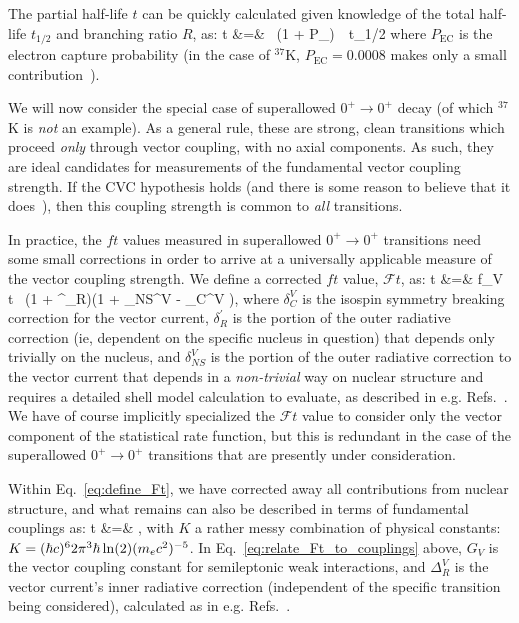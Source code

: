 The partial half-life $t$ can be quickly calculated given knowledge of the total half-life $t_{1/2}$ and branching ratio $R$, as:
\bea
t &=&   \, (1 + P_{}) \,\, t_{1/2}
\eea
where $P_{\mathrm{EC}}$ is the electron capture probability (in the case of $^{37}$K, $P_{\mathrm{EC}}=0.0008$ makes only a small contribution~\cite{SeverijnsTandecki2008}).

We will now consider the special case of superallowed $0^+ \rightarrow 0^+$ decay (of which $^{37}$K is \emph{not} an example).  As a general rule, these are strong, clean transitions which proceed \emph{only} through vector coupling, with no axial components.  As such, they are 
ideal candidates for measurements of the fundamental vector coupling strength.
If the \ac{CVC} hypothesis holds (and there is some reason to believe that it does~\cite{severijns2006}\cite{HardyTownerSuperallowed2020}), then this coupling strength is common to \emph{all} transitions.



In practice, the $ft$ values measured in superallowed $0^+ \rightarrow 0^+$ transitions need some small corrections in order to arrive at a universally applicable measure of the vector coupling strength.  We define a corrected $ft$ value, $\mathcal{F}t$, as:
\bea
{}t &=& f_V t \, (1 + \delta^\prime_R)(1 + \delta_{NS}^V - \delta_C^{V} ),
\label{eq:define_Ft}
\eea
where 
$\delta_C^{V}$ is the isospin symmetry breaking correction for the vector current, 
$\delta^\prime_R$ is the portion of the outer radiative correction (ie, dependent on the specific nucleus in question) that depends only trivially on the nucleus, 
and
$\delta_{NS}^{V}$ is the portion of the outer radiative correction %
to the vector current that depends in a \emph{non-trivial} way on nuclear structure and requires a detailed shell model calculation to evaluate, as described in e.g.  Refs.~\cite{TownerHardy2008}\cite{JausRasche1990}\cite{barker1992}\cite{Towner1992}\cite{Towner1994}.  We have of course implicitly specialized the $\mathcal{F}t$ value to consider only the vector component of the statistical rate function, but this is redundant in the case of the superallowed $0^+ \rightarrow 0^+$ transitions that are presently under consideration.

Within Eq.~\ref{eq:define_Ft}, we have corrected away all contributions from nuclear structure, and what remains can also be described in terms of fundamental couplings as:
\bea
{}t &=& ,
\label{eq:relate_Ft_to_couplings}
\eea
with $K$ a rather messy combination of physical constants: $K = (\hbar c)^6 2\pi^3 \hbar \ln(2) (m_e c^2)^{-5}$.  In Eq.~\ref{eq:relate_Ft_to_couplings} above, $G_V$ is the vector coupling constant for semileptonic weak interactions, and $\Delta_R^{V}$ is the vector current's inner radiative correction (independent of the specific transition being considered), calculated as in e.g. Refs.~\cite{MarcianoSirlin_1986}\cite{MarcianoSirlin_2006}\cite{CzarneckiMarcianoSirlin_2019}.  %

